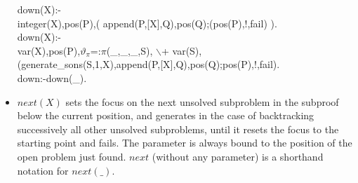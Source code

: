 \documentclass[11pt]{report}
\makeatletter
\newcommand{\ulinv}[1]{\index{#1@\texttt{#1}}}
\makeatother
\begin{document}
\begin{itemize}
 \ulinv{down}
\begin{sf}\begin{tabbing}
down(X):-\\[-0.15ex]
\hspace{2em}integer(X),pos(P),( append(P,[X],Q),pos(Q);(pos(P),!,fail) ).\\[-0.15ex]
down(X):-\\[-0.15ex]
\hspace{2em}var(X),pos(P),$\vartheta_{\pi}$=:$\pi$(\_\hspace{0.1em},\_\hspace{0.1em},\_\hspace{0.1em},S), $\backslash$+ var(S),\\[-0.15ex]
\hspace{2em}(generate\_\hspace{0.1em}sons(S,1,X),append(P,[X],Q),pos(Q);pos(P),!,fail).\\[-0.15ex]
down:-down(\_\hspace{0.1em}).
\end{tabbing}\end{sf}

  
 \item
 $next(X)$ sets the focus on the next unsolved subproblem in the
 subproof below the current position, and generates
 in the case of backtracking successively all other unsolved
 subproblems, until it resets the focus to the starting point and fails.
 The parameter is always bound to the position of the open problem 
 just found. $next$ (without any parameter) is a shorthand notation
 for $next(\_)$.
  

\end{itemize}
\end{document}
